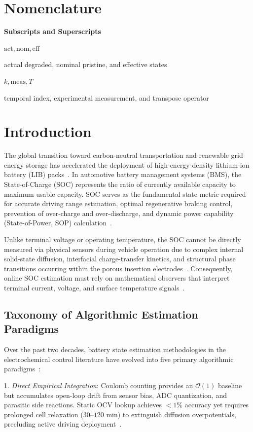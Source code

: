 \documentclass[preprint,12pt]{elsarticle}
\newenvironment{nomenclature}{\section*{Nomenclature}\vspace{0.5em}}{\vspace{1em}}
\newcommand{\entry}[2]{\noindent\parbox[t]{0.26\textwidth}{\raggedright #1}\parbox[t]{0.71\textwidth}{#2}\par\vspace{3pt}}
\newcommand{\EntryHeading}[1]{\par\vspace{8pt}\noindent\textbf{#1}\par\vspace{3pt}}
\begin{document}
\begin{nomenclature}
\EntryHeading{Subscripts and Superscripts}
\entry{$\text{act}, \text{nom}, \text{eff}$}{actual degraded, nominal pristine, and effective states}
\entry{$k, \text{meas}, T$}{temporal index, experimental measurement, and transpose operator}
\end{nomenclature}

\section{Introduction}

The global transition toward carbon-neutral transportation and renewable grid energy storage has accelerated the deployment of high-energy-density lithium-ion battery (LIB) packs~\cite{Tarascon2001,Lu2013review,Mukherjee2024}. In automotive battery management systems (BMS), the State-of-Charge (SOC) represents the ratio of currently available capacity to maximum usable capacity. SOC serves as the fundamental state metric required for accurate driving range estimation, optimal regenerative braking control, prevention of over-charge and over-discharge, and dynamic power capability (State-of-Power, SOP) calculation~\cite{Plett2004part1,Xiong2018joint,Farmann2016peukert}. 

Unlike terminal voltage or operating temperature, the SOC cannot be directly measured via physical sensors during vehicle operation due to complex internal solid-state diffusion, interfacial charge-transfer kinetics, and structural phase transitions occurring within the porous insertion electrodes~\cite{Doyle1993,Torchio2016pybam}. Consequently, online SOC estimation must rely on mathematical observers that interpret terminal current, voltage, and surface temperature signals~\cite{Plett2004part2,Hu2012ecm,Ren2019aging}.

\subsection{Taxonomy of Algorithmic Estimation Paradigms}
Over the past two decades, battery state estimation methodologies in the electrochemical control literature have evolved into five primary algorithmic paradigms~\cite{Xiong2018joint,Hannan2021review}:

1. \emph{Direct Empirical Integration}: Coulomb counting provides an $\mathcal{O}(1)$ baseline~\cite{Plett2004part1} but accumulates open-loop drift from sensor bias, ADC quantization, and parasitic side reactions. Static OCV lookup achieves $<1\%$ accuracy yet requires prolonged cell relaxation ($30\text{--}120\text{ min}$) to extinguish diffusion overpotentials, precluding active driving deployment~\cite{Roscher2011hysteresis,Verbrugge2004hysteresis}.
\end{document}
